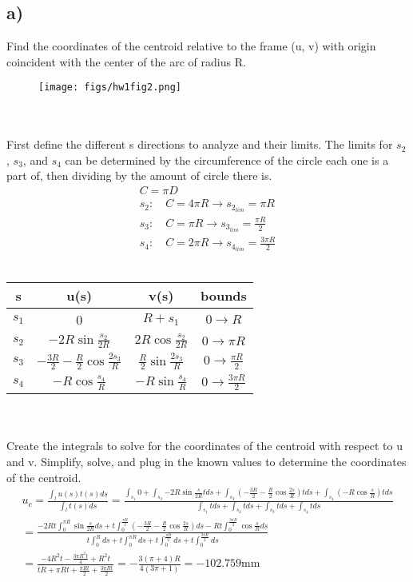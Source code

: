 \documentclass[12 pt]{article}
\begin{document}
\subsection*{a)}
Find the coordinates of the centroid relative to the frame (u, v) with origin coincident with the center of the arc of
radius R.
\begin{figure}[!h]
    \centering
    \texttt{[image: figs/hw1fig2.png]}
\end{figure} \\ \\
First define the different s directions to analyze and their limits. The limits for $s_2$, $s_3$, and $s_4$ can be
determined by the circumference of the circle each one is a part of, then dividing by the amount of circle there is.
\begin{align*}
    C = \pi D \\
    s_2: \quad C = 4\pi R \rightarrow s_{2_{lim}}=\pi R \\
    s_3: \quad C = \pi R \rightarrow s_{3_{lim}}=\frac{\pi R}{2} \\
    s_4: \quad C = 2\pi R \rightarrow s_{4_{lim}}=\frac{3\pi R}{2}
\end{align*} \\
\begin{tabular}{|c|c|c|c|}
    \hline
    s & u(s) & v(s) & bounds \\ \hline
    $s_1$ & 0 & $R+s_1$ & $0 \rightarrow R$ \\
    $s_2$ & $-2R\sin{\frac{s_2}{2R}}$ & $2R\cos{\frac{s_2}{2R}}$ & $0 \rightarrow \pi R$ \\
    $s_3$ & $-\frac{3R}{2} - \frac{R}{2}\cos{\frac{2s_3}{R}}$ & $\frac{R}{2}\sin{\frac{2s_3}{R}}$ & $0 \rightarrow
    \frac{\pi R}{2}$
    \\
    $s_4$ & $-R\cos{\frac{s_4}{R}}$ & $-R\sin{\frac{s_4}{R}}$ & $0 \rightarrow \frac{3\pi R}{2}$ \\
    \hline
\end{tabular} \\ \\
Create the integrals to solve for the coordinates of the centroid with respect to u and v. Simplify, solve, and plug in
the known values to determine the coordinates of the centroid.
\begin{align*}
    u_c=\frac{\int_{l}{u(s)t(s) ds}}{\int_{l}{t(s) ds}}=
    \frac{\int_{s_1}{0} + \int_{s_2}{-2R\sin{\frac{s}{2R}}tds} + \int_{s_3}{(-\frac{3R}{2}-\frac{R}{2}\cos{\frac{2s}{R}})tds}
    + \int_{s_4}{(-R\cos{\frac{s}{R}})tds}}{\int_{s_1}{tds} + \int_{s_2}{tds} + \int_{s_3}{tds} + \int_{s_4}{tds}} \\
    =\frac{-2Rt\int_{0}^{\pi R}{\sin{\frac{s}{2R}ds}} + t\int_{0}^{\frac{\pi R}{2}}{(-\frac{3R}{2}-\frac{R}{2}\cos{\frac{2s}{R}})ds}
    -Rt\int_{0}^{\frac{3\pi R}{2}}{\cos{\frac{s}{R}}ds}}{t\int_{0}^{R}{ds} + t\int_{0}^{\pi R}{ds} + t\int_{0}^{\frac{\pi R}{2}}{ds}
    + t\int_{0}^{\frac{3\pi R}{2}}{ds}} \\
    = \frac{-4R^2t-\frac{3\pi R^2t}{4}+R^2t}{tR + \pi Rt + \frac{\pi Rt}{2} + \frac{3\pi Rt}{2}} = -\frac{3(\pi+4)R}{4(3\pi+1)}
    = -102.759 \textrm{mm}
\end{align*}
\end{document}
